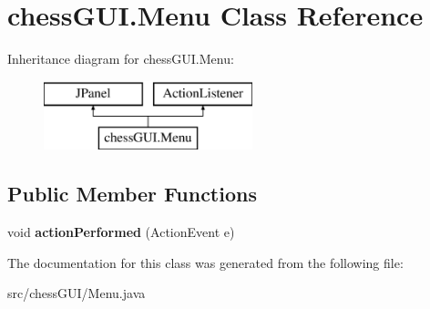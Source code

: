 \hypertarget{classchess_g_u_i_1_1_menu}{}\section{chess\+G\+U\+I.\+Menu Class Reference}
\label{classchess_g_u_i_1_1_menu}
Inheritance diagram for chess\+G\+U\+I.\+Menu\+:\begin{figure}[H]
\begin{center}
\leavevmode
\includegraphics[height=2.000000cm]{classchess_g_u_i_1_1_menu}
\end{center}
\end{figure}
\subsection*{Public Member Functions}
\begin{DoxyCompactItemize}
\item 
\mbox{\label{classchess_g_u_i_1_1_menu_acb80a86cb0dd08e2fdcb107568be3102}} 
void {\bfseries action\+Performed} (Action\+Event e)
\end{DoxyCompactItemize}


The documentation for this class was generated from the following file\+:\begin{DoxyCompactItemize}
\item 
src/chess\+G\+U\+I/Menu.\+java\end{DoxyCompactItemize}
